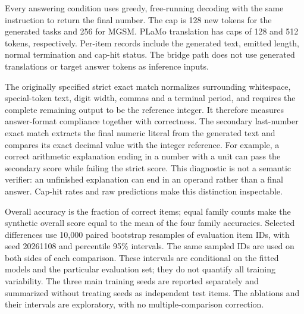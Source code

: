 Every answering condition uses greedy, free-running decoding with the same instruction to return the final number.
The cap is 128 new tokens for the generated tasks and 256 for MGSM.
PLaMo translation has caps of 128 and 512 tokens, respectively.
Per-item records include the generated text, emitted length, normal termination and cap-hit status.
The bridge path does not use generated translations or target answer tokens as inference inputs.

The originally specified strict exact match normalizes surrounding whitespace, special-token text, digit width, commas and a terminal period, and requires the complete remaining output to be the reference integer.
It therefore measures answer-format compliance together with correctness.
The secondary last-number exact match extracts the final numeric literal from the generated text and compares its exact decimal value with the integer reference.
For example, a correct arithmetic explanation ending in a number with a unit can pass the secondary score while failing the strict score.
This diagnostic is not a semantic verifier: an unfinished explanation can end in an operand rather than a final answer.
Cap-hit rates and raw predictions make this distinction inspectable.

Overall accuracy is the fraction of correct items; equal family counts make the synthetic overall score equal to the mean of the four family accuracies.
Selected differences use 10,000 paired bootstrap resamples of evaluation item IDs, with seed 20261108 and percentile 95\% intervals.
The same sampled IDs are used on both sides of each comparison.
These intervals are conditional on the fitted models and the particular evaluation set; they do not quantify all training variability.
The three main training seeds are reported separately and summarized without treating seeds as independent test items.
The ablations and their intervals are exploratory, with no multiple-comparison correction.
